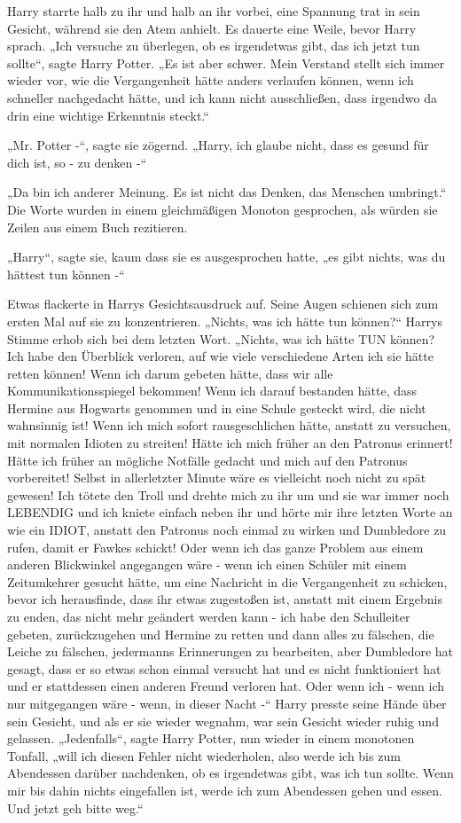 {Harry starrte halb zu ihr und halb an ihr vorbei, eine Spannung trat in sein Gesicht, während sie den Atem anhielt. Es dauerte eine Weile, bevor Harry sprach. „Ich versuche zu überlegen, ob es irgendetwas gibt, das ich jetzt tun sollte“, sagte Harry Potter. „Es ist aber schwer. Mein Verstand stellt sich immer wieder vor, wie die Vergangenheit hätte anders verlaufen können, wenn ich schneller nachgedacht hätte, und ich kann nicht ausschließen, dass irgendwo da drin eine wichtige Erkenntnis steckt.“

„Mr. Potter -“, sagte sie zögernd. „Harry, ich glaube nicht, dass es gesund für dich ist, so - zu denken -“

„Da bin ich anderer Meinung. Es ist nicht das Denken, das Menschen umbringt.“ Die Worte wurden in einem gleichmäßigen Monoton gesprochen, als würden sie Zeilen aus einem Buch rezitieren.

„Harry“, sagte sie, kaum dass sie es ausgesprochen hatte, „es gibt nichts, was du hättest tun können -“

Etwas flackerte in Harrys Gesichtsausdruck auf. Seine Augen schienen sich zum ersten Mal auf sie zu konzentrieren. „Nichts, was ich hätte tun können?“ Harrys Stimme erhob sich bei dem letzten Wort. „Nichts, was ich hätte TUN können? Ich habe den Überblick verloren, auf wie viele verschiedene Arten ich sie hätte retten können! Wenn ich darum gebeten hätte, dass wir alle Kommunikationsspiegel bekommen! Wenn ich darauf bestanden hätte, dass Hermine aus Hogwarts genommen und in eine Schule gesteckt wird, die nicht wahnsinnig ist! Wenn ich mich sofort rausgeschlichen hätte, anstatt zu versuchen, mit normalen Idioten zu streiten! Hätte ich mich früher an den Patronus erinnert! Hätte ich früher an mögliche Notfälle gedacht und mich auf den Patronus vorbereitet! Selbst in allerletzter Minute wäre es vielleicht noch nicht zu spät gewesen! Ich tötete den Troll und drehte mich zu ihr um und sie war immer noch LEBENDIG und ich kniete einfach neben ihr und hörte mir ihre letzten Worte an wie ein IDIOT, anstatt den Patronus noch einmal zu wirken und Dumbledore zu rufen, damit er Fawkes schickt! Oder wenn ich das ganze Problem aus einem anderen Blickwinkel angegangen wäre - wenn ich einen Schüler mit einem Zeitumkehrer gesucht hätte, um eine Nachricht in die Vergangenheit zu schicken, bevor ich herausfinde, dass ihr etwas zugestoßen ist, anstatt mit einem Ergebnis zu enden, das nicht mehr geändert werden kann - ich habe den Schulleiter gebeten, zurückzugehen und Hermine zu retten und dann alles zu fälschen, die Leiche zu fälschen, jedermanns Erinnerungen zu bearbeiten, aber Dumbledore hat gesagt, dass er so etwas schon einmal versucht hat und es nicht funktioniert hat und er stattdessen einen anderen Freund verloren hat. Oder wenn ich - wenn ich nur mitgegangen wäre - wenn, in dieser Nacht -“ Harry presste seine Hände über sein Gesicht, und als er sie wieder wegnahm, war sein Gesicht wieder ruhig und gelassen. „Jedenfalls“, sagte Harry Potter, nun wieder in einem monotonen Tonfall, „will ich diesen Fehler nicht wiederholen, also werde ich bis zum Abendessen darüber nachdenken, ob es irgendetwas gibt, was ich tun sollte. Wenn mir bis dahin nichts eingefallen ist, werde ich zum Abendessen gehen und essen. Und jetzt geh bitte weg.“

}
